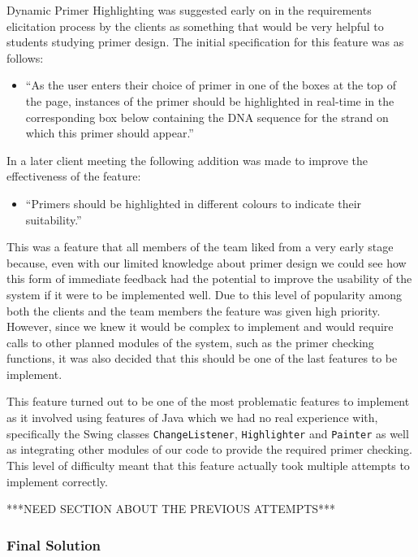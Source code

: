 
Dynamic Primer Highlighting was suggested early on in the requirements
elicitation process by the clients as something that would be very
helpful to students studying primer design. The initial specification
for this feature was as follows:

\begin{itemize}	
\item“As the user enters their choice of primer in one of the boxes at the
top of the page, instances of the primer should be highlighted in
real-time in the corresponding box below containing the DNA sequence for
the strand on which this primer should appear.”
\end{itemize}

In a later client meeting the following addition was made to improve the
effectiveness of the feature:

\begin{itemize}
\item“Primers should be highlighted in different colours to indicate their
suitability.”
\end{itemize}

This was a feature that all members of the team liked from a very early
stage because, even with our limited knowledge about primer design we
could see how this form of immediate feedback had the potential to
improve the usability of the system if it were to be implemented well.
Due to this level of popularity among both the clients and the team
members the feature was given high priority. However, since we knew it
would be complex to implement and would require calls to other planned
modules of the system, such as the primer checking functions, it was
also decided that this should be one of the last features to be
implement.

This feature turned out to be one of the most problematic features to
implement as it involved using features of Java which we had no real
experience with, specifically the Swing classes \texttt{ChangeListener},
\texttt{Highlighter} and \texttt{Painter} as well as integrating other
modules of our code to provide the required primer checking. This level
of difficulty meant that this feature actually took multiple attempts to
implement correctly.

***NEED SECTION ABOUT THE PREVIOUS ATTEMPTS***

\subsubsection{Final Solution}


